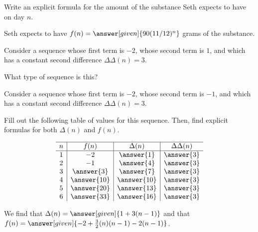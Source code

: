 \documentclass[nooutcomes]{ximera}
\begin{document}
\begin{problem}
\begin{problem}
\begin{problem}
\begin{problem}
\begin{problem}
Write an explicit formula for the amount of the substance Seth expects to have on day $n$.
\begin{prompt}
Seth expects to have $f(n) = \answer[given]{90(11/12)^n}$ grams of the substance.
\end{prompt}

\end{problem}
\end{problem}
\end{problem}
\end{problem}
\end{problem}


\begin{problem}
Consider a sequence whose first term is $-2$, whose second term is $1$, and which has a constant second difference $\Delta \Delta (n) =3$.

What type of sequence is this?
\begin{multipleChoice}
\end{multipleChoice}


\end{problem}



\begin{problem}
Consider a sequence whose first term is $-2$, whose second term is $-1$, and which has a constant second difference $\Delta \Delta (n) =3$.

Fill out the following table of values for this sequence.  Then, find explicit formulas for both $\Delta(n)$ and $f(n)$.

\[
\begin{array}{c|c|c|c} \hline
n & f(n) & \Delta(n) & \Delta \Delta(n) \\ \hline
1 & -2 & \answer{1} & \answer{3} \\
2 & -1 & \answer{4} & \answer{3} \\
3 & \answer{3} & \answer{7} & \answer{3} \\
4 & \answer{10} & \answer{10} & \answer{3} \\
5 & \answer{20} & \answer{13} & \answer{3} \\
6 & \answer{33} & \answer{16} & \answer{3} \\
\end{array}
\]

\begin{prompt}
We find that $\Delta(n) = \answer[given]{1+3(n-1)}$ and that $f(n) = \answer[given]{-2 + \frac{3}{2} (n)(n-1) - 2(n-1)}$.
\end{prompt}

\end{problem}
\end{document}
